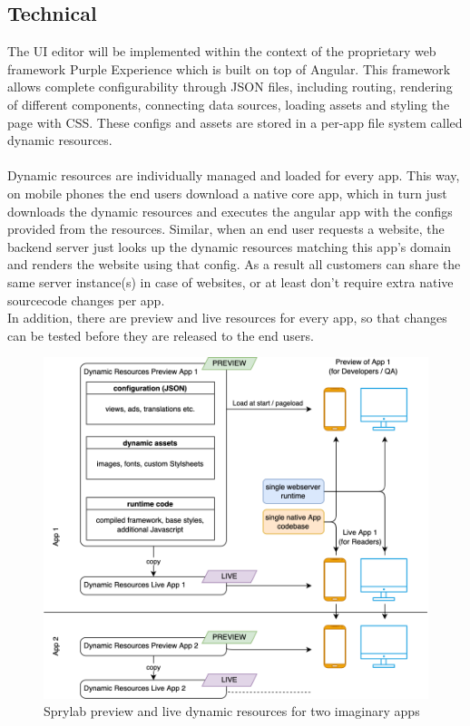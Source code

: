 \subsection{Technical}

The UI editor will be implemented within the context of the proprietary web framework Purple Experience which is built on top of Angular.
This framework allows complete configurability through JSON files, including routing, rendering of different components, connecting data sources, loading assets and styling the page with CSS.
These configs and assets are stored in a per-app file system called \label{def:DynamicResources} dynamic resources.
\\\\
Dynamic resources are individually managed and loaded for every app. This way, on mobile phones the end users download a native core app, which in turn just downloads the dynamic resources and executes the angular app with the configs provided from the resources.
Similar, when an end user requests a website, the backend server just looks up the dynamic resources matching this app's domain and renders the website using that config.
As a result all customers can share the same server instance(s) in case of websites, or at least don't require extra native sourcecode changes per app.
\\
In addition, there are preview and live resources for every app, so that changes can be tested before they are released to the end users.
\begin{figure}[h!]
  \includegraphics[width=\linewidth]{pics/experience_resources.drawio.png}
  \caption{Sprylab preview and live dynamic resources for two imaginary apps}
  \label{fig:dynres}
\end{figure}

